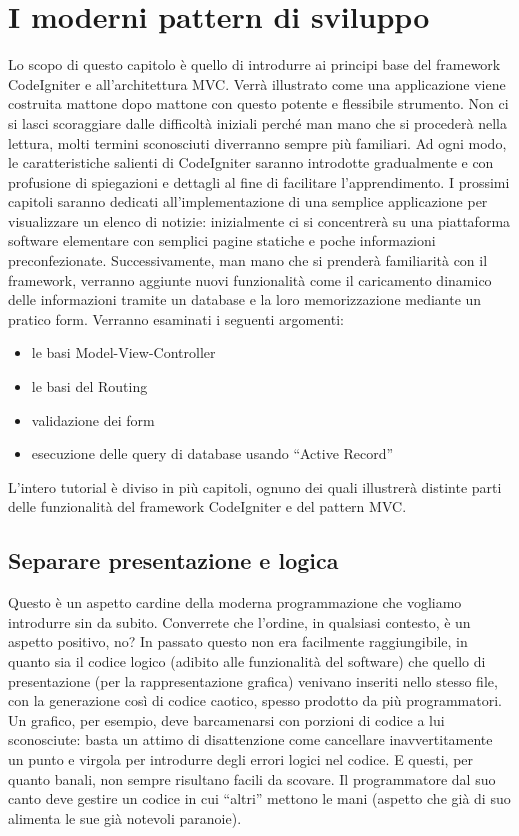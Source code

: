 \chapter{I moderni pattern di sviluppo}
\label{cap:pattern}

Lo scopo di questo capitolo è quello di introdurre ai principi base del framework CodeIgniter e all'architettura \ac{MVC}. Verrà illustrato come una applicazione viene costruita mattone dopo mattone con questo potente e flessibile strumento. Non ci si lasci scoraggiare dalle difficoltà iniziali perché man mano che si procederà nella lettura, molti termini sconosciuti diverranno sempre più familiari. Ad ogni modo, le caratteristiche salienti di CodeIgniter saranno introdotte gradualmente e con profusione di spiegazioni e dettagli al fine di facilitare l'apprendimento. I prossimi capitoli saranno dedicati all'implementazione di una semplice applicazione per visualizzare un elenco di notizie: inizialmente ci si concentrerà su una piattaforma software elementare con semplici pagine statiche e poche informazioni preconfezionate. Successivamente, man mano che si prenderà familiarità con il framework, verranno aggiunte nuovi funzionalità come il caricamento dinamico delle informazioni tramite un database e la loro memorizzazione mediante un pratico form. Verranno esaminati i seguenti argomenti:

\begin{itemize}
\item le basi Model-View-Controller
\item le basi del Routing
\item validazione dei form
\item esecuzione delle query di database usando “Active Record”
\end{itemize}

L'intero tutorial è diviso in più capitoli, ognuno dei quali illustrerà distinte parti delle funzionalità del framework CodeIgniter e del pattern \ac{MVC}.

\section{Separare presentazione e logica}
Questo è un aspetto cardine della moderna programmazione che vogliamo introdurre sin da subito. Converrete che l'ordine, in qualsiasi contesto, è un aspetto positivo, no? In passato questo non era facilmente raggiungibile, in quanto sia il codice logico (adibito alle funzionalità del software) che quello di presentazione (per la rappresentazione grafica) venivano inseriti nello stesso file, con la generazione così di codice caotico, spesso prodotto da più programmatori. Un grafico, per esempio, deve barcamenarsi con porzioni di codice a lui sconosciute: basta un attimo di disattenzione come cancellare inavvertitamente un punto e virgola per introdurre degli errori logici nel codice. E questi, per quanto banali, non sempre risultano facili da scovare. Il programmatore dal suo canto deve gestire un codice in cui ``altri'' mettono le mani (aspetto che già di suo alimenta le sue già notevoli paranoie). 


